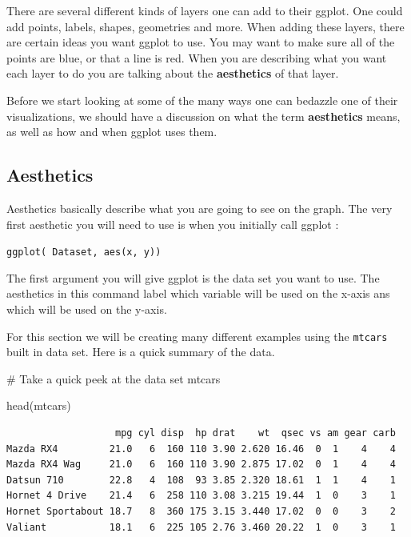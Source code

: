 \documentclass[
  letterpaper,
  DIV=11,
  numbers=noendperiod]{scrreprt}
\newenvironment{Shaded}{\begin{snugshade}}{\end{snugshade}}
\newcommand{\CommentTok}[1]{\textcolor[rgb]{0.37,0.37,0.37}{#1}}
\newcommand{\FunctionTok}[1]{\textcolor[rgb]{0.28,0.35,0.67}{#1}}
\newcommand{\NormalTok}[1]{\textcolor[rgb]{0.00,0.23,0.31}{#1}}
\begin{document}
There are several different kinds of layers one can add to their ggplot.
One could add points, labels, shapes, geometries and more. When adding
these layers, there are certain ideas you want ggplot to use. You may
want to make sure all of the points are blue, or that a line is red.
When you are describing what you want each layer to do you are talking
about the \textbf{aesthetics} of that layer.

Before we start looking at some of the many ways one can bedazzle one of
their visualizations, we should have a discussion on what the term
\textbf{aesthetics} means, as well as how and when ggplot uses them.

\subsection*{Aesthetics}\label{aesthetics}

Aesthetics basically describe what you are going to see on the graph.
The very first aesthetic you will need to use is when you initially call
ggplot :

\texttt{ggplot(\ Dataset,\ aes(x,\ y))}

The first argument you will give ggplot is the data set you want to use.
The aesthetics in this command label which variable will be used on the
x-axis ans which will be used on the y-axis.

For this section we will be creating many different examples using the
\texttt{mtcars} built in data set. Here is a quick summary of the data.

\begin{Shaded}
\begin{Highlighting}[]
\CommentTok{\# Take a quick peek at the data set mtcars}

\FunctionTok{head}\NormalTok{(mtcars)}
\end{Highlighting}
\end{Shaded}

\begin{verbatim}
                   mpg cyl disp  hp drat    wt  qsec vs am gear carb
Mazda RX4         21.0   6  160 110 3.90 2.620 16.46  0  1    4    4
Mazda RX4 Wag     21.0   6  160 110 3.90 2.875 17.02  0  1    4    4
Datsun 710        22.8   4  108  93 3.85 2.320 18.61  1  1    4    1
Hornet 4 Drive    21.4   6  258 110 3.08 3.215 19.44  1  0    3    1
Hornet Sportabout 18.7   8  360 175 3.15 3.440 17.02  0  0    3    2
Valiant           18.1   6  225 105 2.76 3.460 20.22  1  0    3    1
\end{verbatim}
\end{document}
